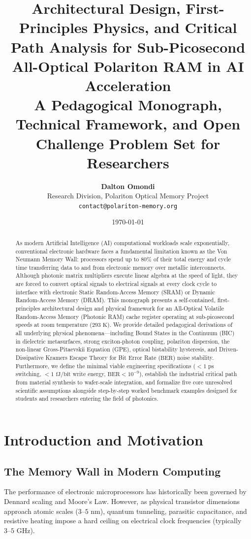 \documentclass[11pt,a4paper]{article}
\title{\textbf{\Large Architectural Design, First-Principles Physics, and Critical Path Analysis for Sub-Picosecond All-Optical Polariton RAM in AI Acceleration}\\[0.6em]
\large A Pedagogical Monograph, Technical Framework, and Open Challenge Problem Set for Researchers}
\author{\textbf{Dalton Omondi}\\
\small Research Division, Polariton Optical Memory Project\\
\small \texttt{contact@polariton-memory.org}}
\date{\today}
\begin{document}
\maketitle

\begin{abstract}
As modern Artificial Intelligence (AI) computational workloads scale exponentially, conventional electronic hardware faces a fundamental limitation known as the Von Neumann Memory Wall: processors spend up to $80\%$ of their total energy and cycle time transferring data to and from electronic memory over metallic interconnects. Although photonic matrix multipliers execute linear algebra at the speed of light, they are forced to convert optical signals to electrical signals at every clock cycle to interface with electronic Static Random-Access Memory (SRAM) or Dynamic Random-Access Memory (DRAM). This monograph presents a self-contained, first-principles architectural design and physical framework for an All-Optical Volatile Random-Access Memory (Photonic RAM) cache register operating at sub-picosecond speeds at room temperature ($293\text{ K}$). We provide detailed pedagogical derivations of all underlying physical phenomena---including Bound States in the Continuum (BIC) in dielectric metasurfaces, strong exciton-photon coupling, polariton dispersion, the non-linear Gross-Pitaevskii Equation (GPE), optical bistability hysteresis, and Driven-Dissipative Kramers Escape Theory for Bit Error Rate ($\text{BER}$) noise stability. Furthermore, we define the minimal viable engineering specifications ($<1\text{~ps}$ switching, $<1\text{~fJ/bit}$ write energy, $\text{BER} < 10^{-9}$), establish the industrial critical path from material synthesis to wafer-scale integration, and formalize five core unresolved scientific assumptions alongside step-by-step worked benchmark examples designed for students and researchers entering the field of photonics.
\end{abstract}

\tableofcontents
\newpage

\section{Introduction and Motivation}

\subsection{The Memory Wall in Modern Computing}
The performance of electronic microprocessors has historically been governed by Dennard scaling and Moore's Law. However, as physical transistor dimensions approach atomic scales ($3\text{--}5\text{ nm}$), quantum tunneling, parasitic capacitance, and resistive heating impose a hard ceiling on electrical clock frequencies (typically $3\text{--}5\text{ GHz}$).
\end{document}
